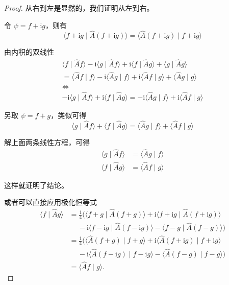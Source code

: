 \begin{proof}
从右到左是显然的，我们证明从左到右。

令 $\psi=f+\mathrm{i} g$，则有
$$\langle f+\mathrm{i} g \mid \hat{A}(f+\mathrm{i} g)\rangle
=\langle\hat{A}(f+\mathrm{i} g) \mid f+\mathrm{i} g\rangle$$

由内积的双线性
$$
\begin{gathered}
\langle f \mid \hat{A} f\rangle-\mathrm{i}\langle g \mid \hat{A} f\rangle+\mathrm{i}\langle f \mid \hat{A} g\rangle+\langle g \mid \hat{A} g\rangle \\
=\langle\hat{A} f \mid f\rangle-\mathrm{i}\langle\hat{A} g \mid f\rangle+\mathrm{i}\langle\hat{A} f \mid g\rangle+\langle\hat{A} g \mid g\rangle \\
\Leftrightarrow \\
-\mathrm{i}\langle g \mid \hat{A} f\rangle+\mathrm{i}\langle f \mid \hat{A} g\rangle=-\mathrm{i}\langle\hat{A} g \mid f\rangle+\mathrm{i}\langle\hat{A} f \mid g\rangle
\end{gathered}
$$

另取 $\psi=f+g$，类似可得
$$\langle g \mid \hat{A} f\rangle+\langle f \mid \hat{A} g\rangle
=\langle\hat{A} g \mid f\rangle+\langle\hat{A} f \mid g\rangle$$

解上面两条线性方程，可得
$$
\begin{aligned}
\langle g \mid \hat{A} f\rangle & =\langle\hat{A} g \mid f\rangle \\
\langle f \mid \hat{A} g\rangle & =\langle\hat{A} f \mid g\rangle
\end{aligned}
$$

这样就证明了结论。

或者可以直接应用极化恒等式
$$
\begin{aligned}
\langle f \mid \hat{A} g\rangle & = \frac{1}{4}(\langle f+g \mid \hat{A}(f+g)\rangle+\mathrm{i}\langle f+\mathrm{i} g \mid \hat{A}(f+\mathrm{i} g)\rangle \\
& \quad\ -\mathrm{i}\langle f-\mathrm{i} g \mid \hat{A}(f-\mathrm{i} g)\rangle-\langle f-g \mid \hat{A}(f-g)\rangle) \\
& = \frac{1}{4}(\langle\hat{A}(f+g) \mid f+g\rangle+\mathrm{i}\langle\hat{A}(f+\mathrm{i} g) \mid f+\mathrm{i} g\rangle \\
& \quad\ -\mathrm{i}\langle\hat{A}(f-\mathrm{i} g) \mid f-\mathrm{i} g\rangle-\langle\hat{A}(f-g) \mid f-g\rangle) \\
& = \langle\hat{A} f \mid g\rangle.
\end{aligned}
$$
\end{proof}


